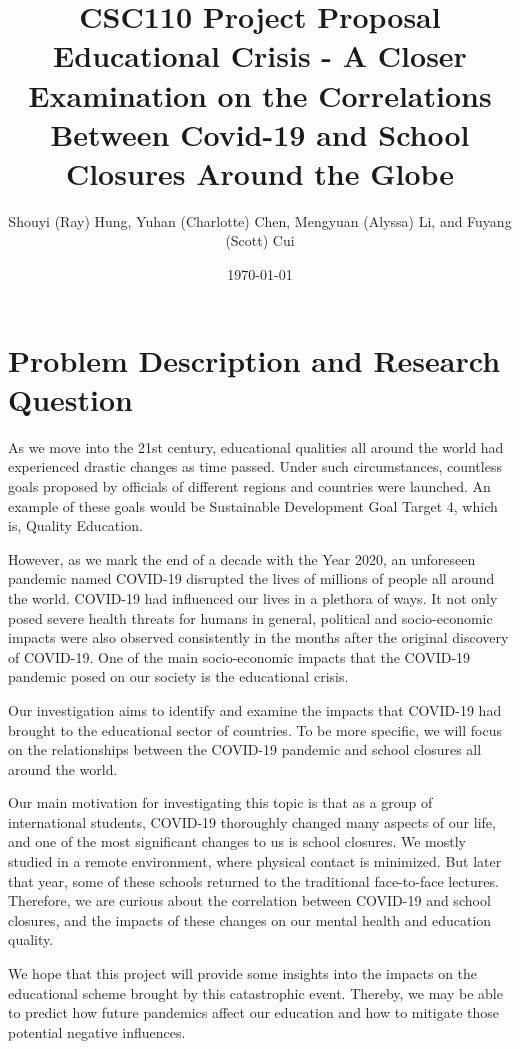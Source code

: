 \documentclass[fontsize=11pt]{article}
\title{CSC110 Project Proposal\\ Educational Crisis - A Closer Examination on the Correlations Between Covid-19 and School Closures Around the Globe}
\author{Shouyi (Ray) Hung, Yuhan (Charlotte) Chen, Mengyuan (Alyssa) Li, and Fuyang (Scott) Cui}
\date{\today}
\begin{document}
\maketitle

\section*{Problem Description and Research Question}

As we move into the 21st century, educational qualities all around the world had experienced drastic changes as time passed. Under such circumstances, countless goals proposed by officials of different regions and countries were launched. An example of these goals would be Sustainable Development Goal Target 4, which is, Quality Education.

However, as we mark the end of a decade with the Year 2020, an unforeseen pandemic named COVID-19 disrupted the lives of millions of people all around the world. COVID-19 had influenced our lives in a plethora of ways. It not only posed severe health threats for humans in general, political and socio-economic impacts were also observed consistently in the months after the original discovery of COVID-19. One of the main socio-economic impacts that the COVID-19 pandemic posed on our society is the educational crisis.

Our investigation aims to identify and examine the impacts that COVID-19 had brought to the educational sector of countries. To be more specific, we will focus on the relationships between the COVID-19 pandemic and school closures all around the world.

Our main motivation for investigating this topic is that as a group of international students, COVID-19 thoroughly changed many aspects of our life, and one of the most significant changes to us is school closures. We mostly studied in a remote environment, where physical contact is minimized. But later that year, some of these schools returned to the traditional face-to-face lectures. Therefore, we are curious about the correlation between COVID-19 and school closures, and the impacts of these changes on our mental health and education quality.

We hope that this project will provide some insights into the impacts on the educational scheme brought by this catastrophic event. Thereby, we may be able to predict how future pandemics affect our education and how to mitigate those potential negative influences.
\end{document}
